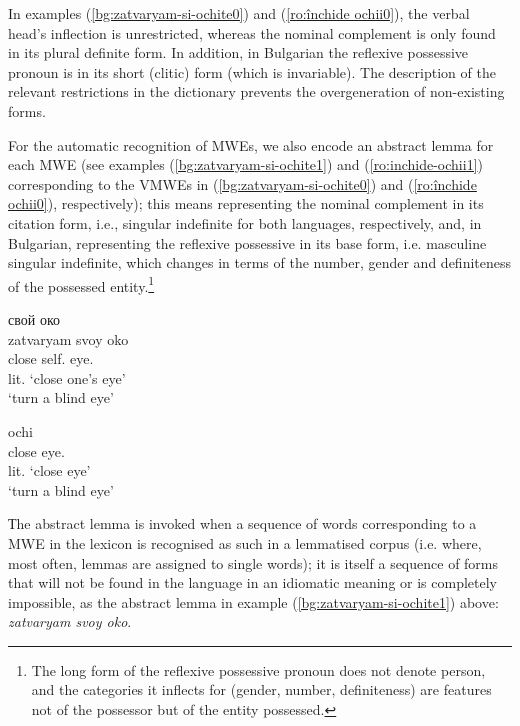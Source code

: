 \documentclass[output=paper,colorlinks,citecolor=brown]{langscibook}
\begin{document}
In examples (\ref{bg:zatvaryam-si-ochite0}) and (\ref{ro:închide ochii0}), the verbal head's inflection is unrestricted, whereas the nominal complement is only found in its plural definite form. In addition, in Bulgarian the reflexive possessive pronoun is in its short (clitic) form (which is invariable). The description of the relevant restrictions in the dictionary prevents the overgeneration of non-existing forms.

For the automatic recognition of MWEs, we also encode an abstract lemma for each MWE (see examples (\ref{bg:zatvaryam-si-ochite1}) and (\ref{ro:inchide-ochii1}) corresponding to the VMWEs in (\ref{bg:zatvaryam-si-ochite0}) and  (\ref{ro:închide ochii0}), respectively); this means representing the nominal complement in its citation form, i.e., singular indefinite for both languages,  respectively, and, in Bulgarian, representing the reflexive possessive in its base form, i.e. masculine %
singular indefinite, which changes in terms of the number, gender and definiteness of the possessed entity.\footnote{The long form of the reflexive possessive pronoun does not denote person, and the categories it inflects for (gender, number, definiteness) are features not of the possessor but of the entity possessed.} 

\begin{exe}
\ex \label{bg:zatvaryam-si-ochite1} 
\settowidth {}
         {свой} {око} \\
 zatvaryam svoy oko \\ 
 close self. eye.\\  
		\glt lit. `close one's eye' \\
`turn a blind eye'

\ex \label{ro:inchide-ochii1}
\settowidth {}
 {ochi} \\
close eye. \\   
\glt lit. `close eye'\\ 
`turn a blind eye'
\end{exe}

Тhe abstract lemma is invoked when a sequence of words corresponding to a MWE in the lexicon is recognised as such in a lemmatised corpus (i.e. where, most often, lemmas are assigned to single words); it is itself a sequence of forms that will not be found in the language in an idiomatic meaning or is completely impossible, as the abstract lemma in example (\ref{bg:zatvaryam-si-ochite1}) above: \textit{{zatvaryam svoy oko}}.
\end{document}
